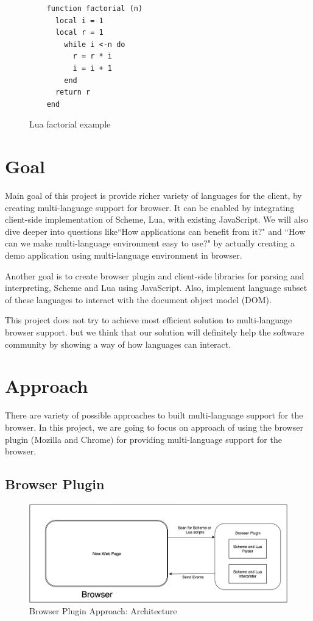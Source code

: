 \begin{figure}[h]
	\begin{lstlisting}
	function factorial (n)
	  local i = 1
	  local r = 1
	    while i <-n do 
	      r = r * i
	      i = i + 1
	    end
	  return r
 	end
	\end{lstlisting}
	\caption{Lua factorial example}
	\label{fig:luafactorial}
\end{figure}


\section{Goal}

Main goal of this project is provide richer variety of languages for the client, by creating multi-language support for browser. It can be enabled by integrating client-side implementation of Scheme, Lua, with existing JavaScript. We will also dive deeper into questions like``How applications can benefit from it?" and ``How can we make multi-language environment easy to use?" by actually creating a demo application using multi-language environment in browser.

Another goal is to create browser plugin and client-side libraries for parsing and interpreting, Scheme and Lua using JavaScript. Also, implement language subset of these languages to interact with the document object model (DOM).

This project does not try to achieve most efficient solution to multi-language browser support. but we think that our solution will definitely help the software community by showing a way of how languages can interact.

\section{Approach}

There are variety of possible approaches to built multi-language support for the browser. In this project, we are going to focus on approach of using the browser plugin (Mozilla and Chrome) for providing multi-language support for the browser. 

\subsection{Browser Plugin } 

\begin{figure}[h]
	\begin{center}
		\includegraphics[width=\linewidth]{./images/browserPluginApproach.png}
	\end{center}
	\caption{Browser Plugin Approach: Architecture}
	\label{fig:pluginarchitecture}
\end{figure}

